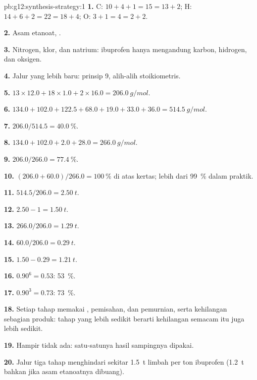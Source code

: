 \begin{solution}{pb:g12:synthesis-strategy:1}
\textbf{1.} C: $10 + 4 + 1 = 15 = 13 + 2$; H: $14 + 6 + 2 = 22 = 18 + 4$;
O: $3 + 1 = 4 = 2 + 2$.

\textbf{2.} Asam etanoat, .

\textbf{3.} Nitrogen, klor, dan natrium: ibuprofen hanya mengandung
karbon, hidrogen, dan oksigen.

\textbf{4.} Jalur yang lebih baru: prinsip 9,  alih-alih 
stoikiometris.

\textbf{5.} $13 \times 12.0 + 18 \times 1.0 + 2 \times 16.0 =
\qty{206.0}{g/mol}$.

\textbf{6.} $134.0 + 102.0 + 122.5 + 68.0 + 19.0 + 33.0 + 36.0 =
\qty{514.5}{g/mol}$.

\textbf{7.} $206.0/514.5 = \qty{40.0}{\percent}$.

\textbf{8.} $134.0 + 102.0 + 2.0 + 28.0 = \qty{266.0}{g/mol}$.

\textbf{9.} $206.0/266.0 = \qty{77.4}{\percent}$.

\textbf{10.} $(206.0 + 60.0)/266.0 = \qty{100}{\percent}$ di atas kertas;
lebih dari \qty{99}{\percent} dalam praktik.

\textbf{11.} $514.5/206.0 = \qty{2.50}{t}$.

\textbf{12.} $2.50 - 1 = \qty{1.50}{t}$.

\textbf{13.} $266.0/206.0 = \qty{1.29}{t}$.

\textbf{14.} $60.0/206.0 = \qty{0.29}{t}$.

\textbf{15.} $1.50 - 0.29 = \qty{1.21}{t}$.

\textbf{16.} $0.90^6 = 0.53$: \qty{53}{\percent}.

\textbf{17.} $0.90^3 = 0.73$: \qty{73}{\percent}.

\textbf{18.} Setiap tahap memakai , pemisahan, dan pemurnian,
serta kehilangan sebagian produk: tahap yang lebih sedikit berarti
kehilangan semacam itu juga lebih sedikit.

\textbf{19.} Hampir tidak ada: satu-satunya hasil sampingnya dipakai.

\textbf{20.} Jalur tiga tahap menghindari sekitar \qty{1.5}{t} limbah per
ton ibuprofen (\qty{1.2}{t} bahkan jika asam etanoatnya dibuang).
\end{solution}
